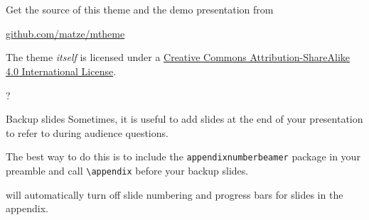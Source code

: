 \documentclass[10pt,aspectratio=169,english]{beamer}
\begin{document}
\section{}

\begin{frame}{}

  Get the source of this theme and the demo presentation from

  \begin{center}\url{github.com/matze/mtheme}\end{center}

  The theme \emph{itself} is licensed under a
  \href{http://creativecommons.org/licenses/by-sa/4.0/}{Creative Commons
  Attribution-ShareAlike 4.0 International License}.

  \begin{center}\ccbysa\end{center}

\end{frame}

\begin{frame}[standout]
  ?
\end{frame}

\appendix

\begin{frame}[fragile]{Backup slides}
  Sometimes, it is useful to add slides at the end of your presentation to
  refer to during audience questions.

  The best way to do this is to include the \verb|appendixnumberbeamer|
  package in your preamble and call \verb|\appendix| before your backup slides.

  \themename will automatically turn off slide numbering and progress bars for
  slides in the appendix.
\end{frame}

\begin{frame}[allowframebreaks]{}

  
  

\end{frame}
\end{document}
